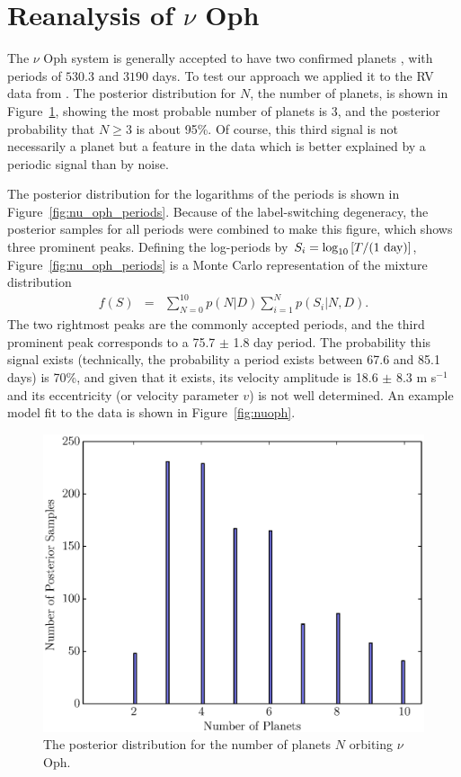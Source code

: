 \documentclass[useAMS,usenatbib]{mn2e}
\begin{document}
\section{Reanalysis of $\nu$ Oph}
The $\nu$ Oph system is generally accepted to have two confirmed planets
\citep[e.g.][]{2011AIPC.1331..102Q, 2012PASJ...64..135S, fengji}, with periods
of $530.3$ and $3190$ days. To test our approach we applied it to the RV
data from \citet{2012PASJ...64..135S}.
The posterior distribution for $N$, the number of planets, is shown in
Figure~\ref{fig:nu_oph_N}, showing the most probable number of planets is 3,
and the posterior probability that $N \geq 3$ is about 95\%. Of course, this
third signal is not necessarily a planet but a feature in the data which is
better explained by a periodic signal than by noise.

The posterior distribution for the logarithms of the periods is shown in
Figure~\ref{fig:nu_oph_periods}. Because of the label-switching degeneracy,
the posterior samples for all periods were combined to make this figure, which
shows three prominent peaks. Defining the log-periods by
$S_i =  \log_{10}\left[T/(\textnormal{1 day})\right]$,
Figure~\ref{fig:nu_oph_periods} is a Monte Carlo representation
of the mixture distribution
\begin{eqnarray}
f(S) &=& \sum_{N=0}^{10} p(N | D)\sum_{i=1}^N p(S_i | N, D).
\end{eqnarray}
The two rightmost peaks are the commonly accepted periods, and the third
prominent peak corresponds to a 75.7 $\pm$ 1.8 day period. The probability
this signal exists (technically, the probability a period exists between
67.6 and 85.1 days)
is 70\%, and given that it exists, its velocity amplitude
is 18.6 $\pm$ 8.3 m s$^{-1}$ and its eccentricity (or velocity parameter $v$)
is not well determined.
An example model fit to the data is shown in Figure~\ref{fig:nuoph}.

\begin{figure}
\includegraphics[scale=0.45]{Figures/nu_oph_N.eps}
\caption{The posterior distribution for the number of planets $N$ orbiting
$\nu$ Oph.\label{fig:nu_oph_N}}
\end{figure}
\end{document}

